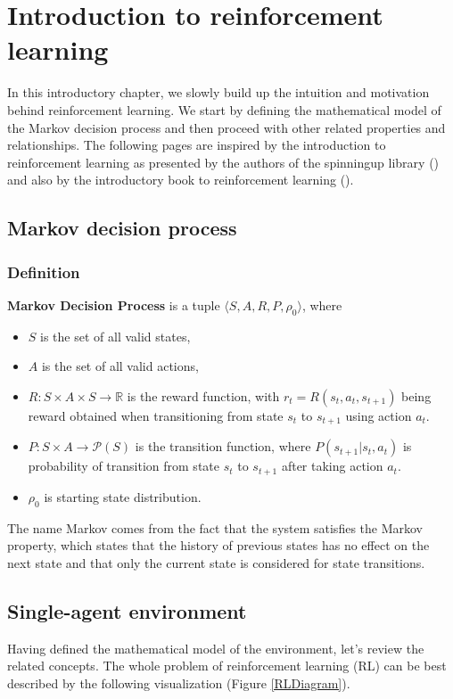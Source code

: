 \chapter{Introduction to reinforcement learning}\label{IntroductionChapter}

In this introductory chapter, we slowly build up the intuition and motivation behind reinforcement learning.
We start by defining the mathematical model of the Markov decision process and then proceed with other related properties and relationships.
The following pages are inspired by the introduction to reinforcement learning as presented by the authors of the spinningup library (\cite{SpinningUpIntro}) and also by the introductory book to reinforcement learning (\cite{sutton2018reinforcement}).

\section{Markov decision process}
\subsection*{Definition}

\label{MDP} \textbf{Markov Decision Process} is a tuple $\langle S, A, R, P, \rho_0\rangle$, where
\begin{itemize}
    \item $S$ is the set of all valid states,
    \item $A$ is the set of all valid actions,
    \item $R: S \times A \times S \rightarrow \mathbb{R}$ is the reward function, with $r_t=R(s_t, a_t,s_{t+1})$ being reward obtained when transitioning from state $s_t$ to $s_{t+1}$ using action $a_t$.
    \item $P: S \times A \rightarrow \mathcal{P}(S)$ is the transition function, where $P(s_{t+1}|s_t, a_t)$ is probability of transition from state $s_t$ to $s_{t+1}$ after taking action $a_t$. 
    \item $\rho_0$ is starting state distribution.
\end{itemize}
The name Markov comes from the fact that the system satisfies the Markov property, which states that the history of previous states has no effect on the next state and that only the current state is considered for state transitions.

\section{Single-agent environment}
Having defined the mathematical model of the environment, let's review the related concepts.
The whole problem of reinforcement learning (RL) can be best described by the following visualization (Figure \ref{RLDiagram}).


